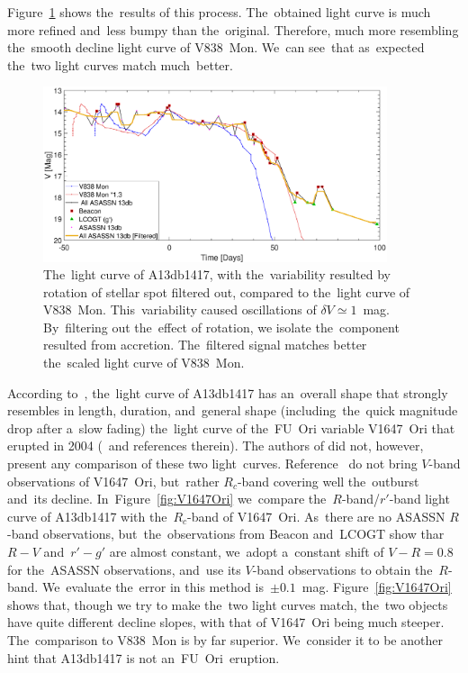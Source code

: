 \documentclass[galaxies,article,accept,moreauthors,pdftex]{mdpi}
\begin{document}
Figure~\ref{fig:v838_VS_13db_filtered} shows the~results of this process.
The~obtained light curve is much more refined and~less bumpy than the~original.
Therefore, much more resembling the~smooth decline light curve of V838~Mon.
We~can see~that as~expected the~two light curves match much~better.


\begin{figure}[t]
\centering
\includegraphics[trim= 0.9cm 0.0cm 1.0cm 0.8cm,clip=true,width=0.9\textwidth]{ALL9.eps} %
\caption{The~light curve of A13db1417, with the~variability resulted by rotation of stellar spot filtered out, compared to the~light curve of V838~Mon. This~variability caused oscillations of $\delta V \simeq 1$~mag. By~filtering out the~effect of rotation, we isolate the~component resulted from accretion.
The~filtered signal matches better the~scaled light curve of V838~Mon.}
\label{fig:v838_VS_13db_filtered}
\end{figure}

According to~\cite{SiciliaAguilaretal2017}, the~light curve of A13db1417 has an~overall shape that strongly resembles in length, duration, and~general shape (including~the~quick magnitude
drop after a~slow fading) the~light curve of the~FU~Ori variable V1647~Ori that erupted in 2004 (\cite{Fedeleetal2007}~and references therein). The authors of \cite{SiciliaAguilaretal2017} did not, however, present any comparison of these two light~curves. Reference~\cite{Fedeleetal2007} do not bring $V$-band observations of V1647~Ori, but~rather $R_c$-band covering well the~outburst and~its decline. In~Figure~\ref{fig:V1647Ori} we~compare the~$R$-band/$r'$-band light curve of A13db1417 with the~$R_c$-band of V1647~Ori. As~there are no ASASSN $R$-band observations, but~the~observations from Beacon and~LCOGT show thar $R-V$ and~$r'-g'$ are almost constant, we~adopt a~constant shift of $V-R=0.8$ for the~ASASSN observations, and~use its $V$-band observations to obtain the~$R$-band. We~evaluate the~error in this method is~$\pm 0.1$~mag.  Figure~\ref{fig:V1647Ori} shows that, though we try to make the~two light curves match, the~two objects have quite different decline slopes, with that of V1647~Ori being much steeper. The~comparison to V838~Mon is by far superior. We~consider it to be another hint that A13db1417 is not an~FU~Ori~eruption.
\end{document}
